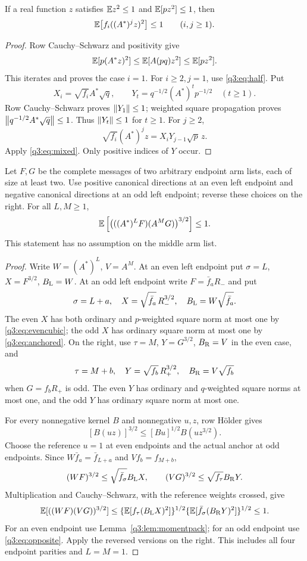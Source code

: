\begin{lemma}\label{q3:lem:momentpack}
If a real function $z$ satisfies $\mathbb E z^2\le1$ and $\mathbb E[pz^2]\le1$, then
\begin{equation}\label{q3:eq:momentpack}
 \mathbb E\bigl[f_i((A^*)^jz)^2\bigr]\le1\qquad(i,j\ge1).
\end{equation}
\end{lemma}
\begin{proof}
Row Cauchy--Schwarz and positivity give
\[
 \mathbb E[p(A^*z)^2]\le\mathbb E[A(pq)z^2]\le\mathbb E[pz^2].
\]
This iterates and proves the case $i=1$. For $i\ge2,j=1$, use \eqref{q3:eq:half}. Put
\[
 X_i=\sqrt{f_i}A^*\sqrt q,\qquad
 Y_t=q^{-1/2}(A^*)^tp^{-1/2}\quad(t\ge1).
\]
Row Cauchy--Schwarz proves $\left\lVert Y_1\right\rVert\le1$; weighted square propagation proves $\left\lVert q^{-1/2}A^*\sqrt q\right\rVert\le1$. Thus $\left\lVert Y_t\right\rVert\le1$ for $t\ge1$. For $j\ge2$,
\[
 \sqrt{f_i}(A^*)^jz=X_iY_{j-1}\sqrt p\,z.
\]
Apply \eqref{q3:eq:mixed}. Only positive indices of $Y$ occur.
\end{proof}

\begin{theorem}\label{q3:thm:endpoints}
Let $F,G$ be the complete messages of two arbitrary endpoint arm lists, each of size at least two. Use positive canonical directions at an even left endpoint and negative canonical directions at an odd left endpoint; reverse these choices on the right. For all $L,M\ge1$,
\begin{equation}\label{q3:eq:joint}
 \mathbb E\left[\bigl(((A^*)^LF)(A^MG)\bigr)^{3/2}\right]\le1.
\end{equation}
This statement has no assumption on the middle arm list.
\end{theorem}
\begin{proof}
Write $W=(A^*)^L$, $V=A^M$. At an even left endpoint put $\sigma=L$, $X=F^{3/2}$, $B_{\rm L}=W$. At an odd left endpoint write $F=\bar f_aR_-$ and put
\[
 \sigma=L+a,\quad X=\sqrt{\bar f_a}\,R_-^{3/2},\quad
 B_{\rm L}=W\sqrt{\bar f_a}.
\]
The even $X$ has both ordinary and $p$-weighted square norm at most one by \eqref{q3:eq:evencubic}; the odd $X$ has ordinary square norm at most one by \eqref{q3:eq:anchored}. On the right, use $\tau=M$, $Y=G^{3/2}$, $B_{\rm R}=V$ in the even case, and
\[
 \tau=M+b,\quad Y=\sqrt{f_b}\,R_+^{3/2},\quad B_{\rm R}=V\sqrt{f_b}
\]
when $G=f_bR_+$ is odd. The even $Y$ has ordinary and $q$-weighted square norms at most one, and the odd $Y$ has ordinary square norm at most one.

For every nonnegative kernel $B$ and nonnegative $u,z$, row H\"older gives
\[
 [B(uz)]^{3/2}\le[Bu]^{1/2}B(uz^{3/2}).
\]
Choose the reference $u=1$ at even endpoints and the actual anchor at odd endpoints. Since $W\bar f_a=\bar f_{L+a}$ and $Vf_b=f_{M+b}$,
\[
 (WF)^{3/2}\le\sqrt{\bar f_\sigma}B_{\rm L}X,
 \qquad (VG)^{3/2}\le\sqrt{f_\tau}B_{\rm R}Y.
\]
Multiplication and Cauchy--Schwarz, with the reference weights crossed, give
\[
 \mathbb E[((WF)(VG))^{3/2}]
 \le\{\mathbb E[f_\tau(B_{\rm L}X)^2]\}^{1/2}
      \{\mathbb E[\bar f_\sigma(B_{\rm R}Y)^2]\}^{1/2}\le1.
\]
For an even endpoint use Lemma~\ref{q3:lem:momentpack}; for an odd endpoint use \eqref{q3:eq:opposite}. Apply the reversed versions on the right. This includes all four endpoint parities and $L=M=1$.
\end{proof}

